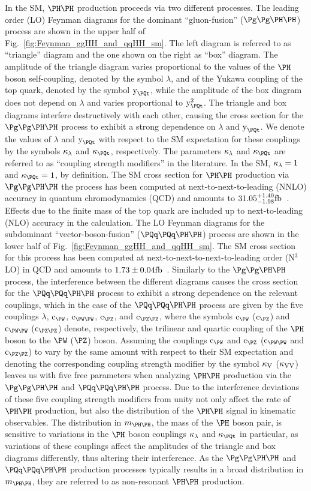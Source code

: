 In the SM, $\HH$ production proceeds via two different processes.
The leading order (LO) Feynman diagrams for the dominant ``gluon-fusion'' ($\ggHH$) process are shown in the upper half of Fig.~\ref{fig:Feynman_ggHH_and_qqHH_sm}.
The left diagram is referred to as ``triangle'' diagram and the one shown on the right as ``box'' diagram.
The amplitude of the triangle diagram varies proportional to the values of the $\PHiggs$ boson self-coupling, denoted by the symbol $\lambda$, 
and of the Yukawa coupling of the top quark, denoted by the symbol $\yt$,
while the amplitude of the box diagram does not depend on $\lambda$ and varies proportional to $\yt^{2}$.
The triangle and box diagrams interfere destructively with each other, 
causing the cross section for the $\ggHH$ process to exhibit a strong dependence on $\lambda$ and $\yt$.
We denote the values of $\lambda$ and $\yt$ with respect to the SM expectation for these couplings by the symbols $\kappa_{\lambda}$ and $\kappat$, respectively.
The parameters $\kappa_{\lambda}$ and $\kappat$ are referred to as ``coupling strength modifiers'' in the literature.
In the SM, $\kappa_{\lambda} = 1$ and $\kappat = 1$, by definition.
The SM cross section for $\HH$ production via $\ggHH$ the process has been computed at next-to-next-to-leading (NNLO) accuracy in quantum chromodynamics (QCD)
and amounts to $31.05^{+1.40}_{-1.98}\text{fb}$~\cite{Grazzini:2018hh}.
Effects due to the finite mass of the top quark are included up to next-to-leading (NLO) accuracy in the calculation.
The LO Feynman diagrams for the subdominant ``vector-boson-fusion'' ($\qqHH$) process are shown in the lower half of Fig.~\ref{fig:Feynman_ggHH_and_qqHH_sm}.
The  SM cross section for this process has been computed at next-to-next-to-next-to-leading order (N$^{3}$LO) in QCD
and amounts to $1.73 \pm 0.04\text{fb}$~\cite{Dreyer:2018qbw}.
Similarly to the $\ggHH$ process, the interference between the different diagrams causes the cross section for the $\qqHH$ process to exhibit a strong dependence on the relevant couplings,
which in the case of the $\qqHH$ process are given by the five couplings $\lambda$, $\cW$, $\cWW$, $\cZ$, and $\cZZ$,
where the symbols $\cW$ ($\cZ$) and $\cWW$ ($\cZZ$) denote, respectively, the trilinear and quartic coupling of the $\PHiggs$ boson to the $\PW$ ($\PZ$) boson.
Assuming the couplings $\cW$ and $\cZ$ ($\cWW$ and $\cZZ$) to vary by the same amount with respect to their SM expectation 
and denoting the corresponding coupling strength modifier by the symbol $\kappa_{\textrm{V}}$ ($\kappa_{\textrm{V}\textrm{V}}$) leaves us with five free parameters
when analyzing $\HH$ production via the $\ggHH$ and $\qqHH$ process.
Due to the interference deviations of these five coupling strength modifiers from unity not only affect the rate of $\HH$ production,
but also the distribution of the $\HH$ signal in kinematic observables.
The distribution in $\mHH$, the mass of the $\PHiggs$ boson pair, is sensitive to variations in the $\PHiggs$ boson couplings $\kappa_{\lambda}$ and $\kappat$ in particular,
as variations of these couplings affect the amplitudes of the triangle and box diagrams differently, thus altering their interference.
As the $\ggHH$ and $\qqHH$ production processes typically results in a broad distribution in $\mHH$,
they are referred to as non-resonant $\HH$ production.

